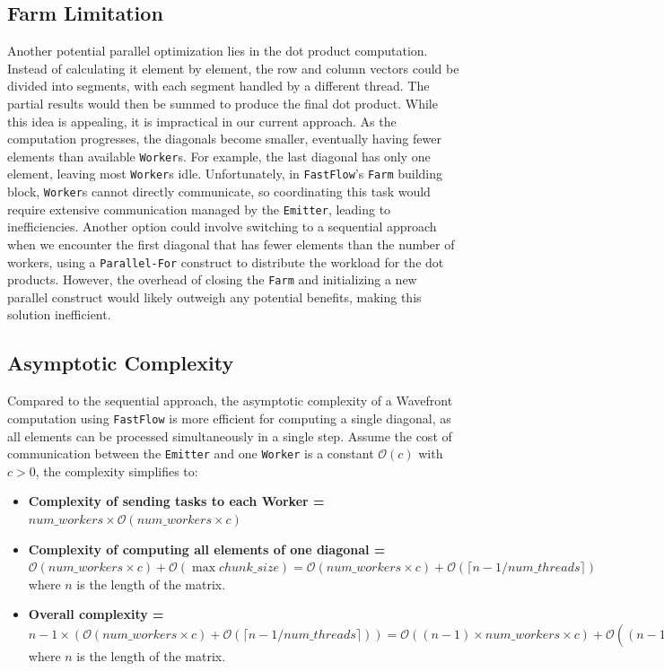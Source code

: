 \subsection*{Farm Limitation}
Another potential parallel optimization lies in the dot product computation. Instead of calculating it element by element, the row and column vectors could be divided into segments, with each segment handled by a different thread. The partial results would then be summed to produce the final dot product. While this idea is appealing, it is impractical in our current approach. As the computation progresses, the diagonals become smaller, eventually having fewer elements than available \texttt{Worker}s. For example, the last diagonal has only one element, leaving most \texttt{Worker}s idle. Unfortunately, in \texttt{FastFlow}'s \texttt{Farm} building block, \texttt{Worker}s cannot directly communicate, so coordinating this task would require extensive communication managed by the \texttt{Emitter}, leading to inefficiencies. Another option could involve switching to a sequential approach when we encounter the first diagonal that has fewer elements than the number of workers, using a \texttt{Parallel-For} construct to distribute the workload for the dot products. However, the overhead of closing the \texttt{Farm} and initializing a new parallel construct would likely outweigh any potential benefits, making this solution inefficient. 

\subsection*{Asymptotic Complexity}
Compared to the sequential approach, the asymptotic complexity of a Wavefront computation using \texttt{FastFlow} is more efficient for computing a single diagonal, as all elements can be processed simultaneously in a single step. Assume the cost of communication between the \texttt{Emitter} and one \texttt{Worker} is a constant $\mathcal{O}(c)$ with $c > 0$, the complexity simplifies to:

\begin{itemize}
    \item \textbf{Complexity of sending tasks to each Worker =} $num\_workers \times \mathcal{O}(num\_workers \times c)$

    \item \textbf{Complexity of computing all elements of one diagonal =} $ \mathcal{O}(num\_workers \times c) + \mathcal{O}(\max{chunk\_size}) = \mathcal{O}(num\_workers \times c) + \mathcal{O}(\lceil n-1 / num\_threads \rceil)$ where $n$ is the length of the matrix.

    \item \textbf{Overall complexity = } $n-1 \times (\mathcal{O}(num\_workers \times c) + \mathcal{O}(\lceil n-1 / num\_threads \rceil) ) =\mathcal{O}((n - 1) \times num\_workers \times c) + \mathcal{O}((n-1)^{2} / num\_threads)$ where $n$ is the length of the matrix.
\end{itemize}

